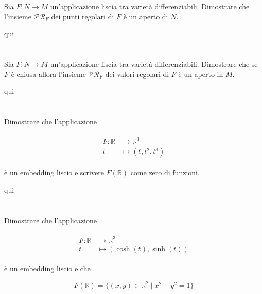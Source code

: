 \begin{tcolorbox}
	Sia $ F : N \to M $ un'applicazione liscia tra varietà differenziabili. Dimostrare che l'insieme $ \mathcal{PR}_{F} $ dei punti regolari di $ F $ è un aperto di $ N $.
\end{tcolorbox}

qui

\tocless\section{}\label{es2-18}

\begin{tcolorbox}
		Sia $ F : N \to M $ un'applicazione liscia tra varietà differenziabili. Dimostrare che se $ F $ è chiusa allora  l'insieme $ \mathcal{VR}_{F} $ dei valori regolari di $ F $ è un aperto in $ M $.
\end{tcolorbox}

qui

\tocless\section{}\label{es2-19}

\begin{tcolorbox}
	Dimostrare che l'applicazione
	
	\begin{align}
		\begin{split}
			F : \mathbb{R} &\to \mathbb{R}^{3}\\
			t &\mapsto (t,t^{2},t^{3})
		\end{split}
	\end{align}

	è un embedding liscio e scrivere $ F(\mathbb{R}) $ come zero di funzioni.
\end{tcolorbox}

qui

\tocless\section{}\label{es2-20}

\begin{tcolorbox}
	Dimostrare che l'applicazione
	
	\begin{align}
		\begin{split}
			F : \mathbb{R} &\to \mathbb{R}^{3}\\
			t &\mapsto (\cosh(t),\sinh(t))
		\end{split}
	\end{align}
	
	è un embedding liscio e che
	
	\begin{equation}
		F(\mathbb{R}) = \{ (x,y) \in \mathbb{R}^{2} \mid x^{2}-y^{2} = 1 \}
	\end{equation}
\end{tcolorbox}

